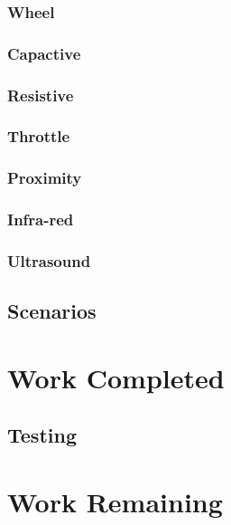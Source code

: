 \documentclass[10pt]{ecsprogressreport}
\begin{document}
\subsubsection{Wheel}

\subsubsection*{Capactive}

\subsubsection*{Resistive}

\subsubsection{Throttle}

\subsubsection{Proximity}

\subsubsection*{Infra-red}

\subsubsection*{Ultrasound}

\subsection{Scenarios}

\section{Work Completed}

\subsection{Testing}

\section{Work Remaining}
\end{document}
